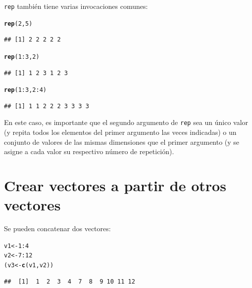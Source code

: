 \documentclass{config/apuntes}\usepackage[]{graphicx}\usepackage[]{xcolor}
\makeatletter
\newcommand{\hlnum}[1]{\textcolor[rgb]{0.686,0.059,0.569}{#1}}%
\newcommand{\hlopt}[1]{\textcolor[rgb]{0,0,0}{#1}}%
\newcommand{\hldef}[1]{\textcolor[rgb]{0.345,0.345,0.345}{#1}}%
\newcommand{\hlkwb}[1]{\textcolor[rgb]{0.69,0.353,0.396}{#1}}%
\newcommand{\hlkwd}[1]{\textcolor[rgb]{0.737,0.353,0.396}{\textbf{#1}}}%
\newenvironment{kframe}{%
 \def\at@end@of@kframe{}%
 \ifinner\ifhmode%
  \def\at@end@of@kframe{\end{minipage}}%
  \begin{minipage}{\columnwidth}%
 \fi\fi%
 \def\FrameCommand##1{\hskip\@totalleftmargin \hskip-\fboxsep
 \colorbox{shadecolor}{##1}\hskip-\fboxsep
     \hskip-\linewidth \hskip-\@totalleftmargin \hskip\columnwidth}%
 \MakeFramed {\advance\hsize-\width
   \@totalleftmargin\z@ \linewidth\hsize
   \@setminipage}}%
 {\par\unskip\endMakeFramed%
 \at@end@of@kframe}
\newenvironment{knitrout}{}{} %
\newcommand{\code}[1]{\texttt{#1}}
\makeatother
\begin{document}
\code{rep} también tiene varias invocaciones comunes:
\begin{knitrout}
\color{fgcolor}\begin{kframe}
\begin{alltt}
\hlkwd{rep}\hldef{(}\hlnum{2}\hldef{,} \hlnum{5}\hldef{)}
\end{alltt}
\begin{verbatim}
## [1] 2 2 2 2 2
\end{verbatim}
\begin{alltt}
\hlkwd{rep}\hldef{(}\hlnum{1}\hlopt{:}\hlnum{3}\hldef{,} \hlnum{2}\hldef{)}
\end{alltt}
\begin{verbatim}
## [1] 1 2 3 1 2 3
\end{verbatim}
\begin{alltt}
\hlkwd{rep}\hldef{(}\hlnum{1}\hlopt{:}\hlnum{3}\hldef{,} \hlnum{2}\hlopt{:}\hlnum{4}\hldef{)}
\end{alltt}
\begin{verbatim}
## [1] 1 1 2 2 2 3 3 3 3
\end{verbatim}
\end{kframe}
\end{knitrout}

En este caso, es importante que el segundo argumento de \code{rep} sea un único valor (y repita todos los elementos del primer argumento las veces indicadas) o un conjunto de valores de las mismas dimensiones que el primer argumento (y se asigne a cada valor su respectivo número de repetición). 

\section{Crear vectores a partir de otros vectores}
Se pueden concatenar dos vectores:

\begin{knitrout}
\color{fgcolor}\begin{kframe}
\begin{alltt}
\hldef{v1} \hlkwb{<-} \hlnum{1}\hlopt{:}\hlnum{4}
\hldef{v2} \hlkwb{<-} \hlnum{7}\hlopt{:}\hlnum{12}
\hldef{(v3} \hlkwb{<-} \hlkwd{c}\hldef{(v1, v2))}
\end{alltt}
\begin{verbatim}
##  [1]  1  2  3  4  7  8  9 10 11 12
\end{verbatim}
\end{kframe}
\end{knitrout}
\end{document}
